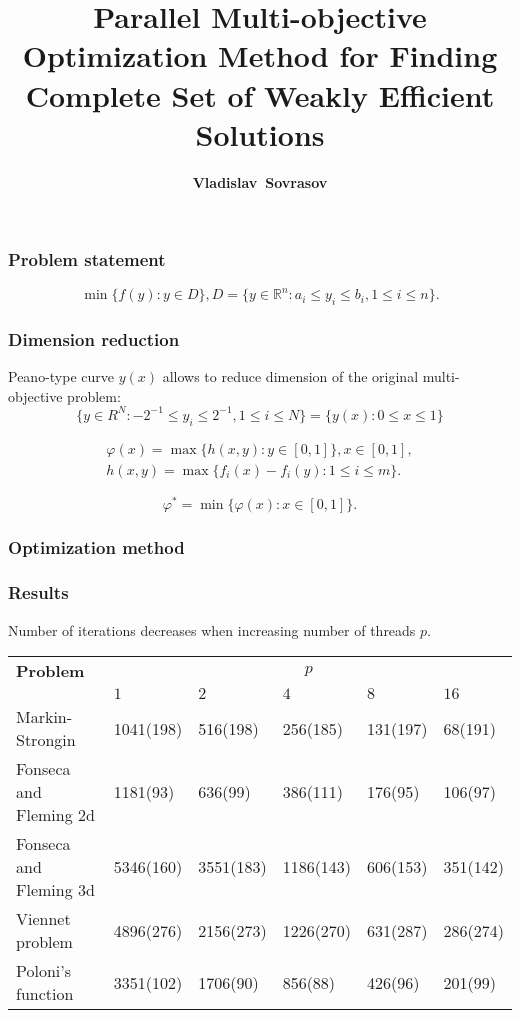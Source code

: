 \documentclass[aspectratio=1610]{beamer}
\title{Parallel Multi-objective Optimization Method for Finding Complete Set of Weakly Efficient Solutions}
\author{\textbf{Vladislav~Sovrasov}}
\institute{Lobachevsky University}
\date{}
\begin{document}
\begin{frame}
\titlepage
\end{frame}

\begin{frame}
  \frametitle{Problem statement}
  \begin{displaymath}
    \label{eq:problem}
    \min\{f(y): y\in D\}, D=\{y\in \mathbb{R}^n: a_i \leqslant y_i \leqslant b_i, 1\leqslant i
  \leqslant n \}.
\end{displaymath}
\end{frame}

\begin{frame}
  \frametitle{Dimension reduction}
  Peano-type curve \(y(x)\) allows to reduce dimension of the original multi-objective problem:
  \begin{displaymath}
  \lbrace y\in R^N:-2^{-1}\leqslant y_i\leqslant 2^{-1},1\leqslant i\leqslant
  N\rbrace=\{y(x):0\leqslant x\leqslant 1\}
  \end{displaymath}


  \begin{eqnarray*}
    \varphi(x)=\max\{h(x,y):y\in [0,1]\},x\in [0,1],\\
    h(x,y)=\max\{f_i(x)-f_i(y):1\leqslant i\leqslant m\}.
  \end{eqnarray*}

  \begin{displaymath}
    \varphi^*=\min\{\varphi(x):x\in [0,1]\}.
  \end{displaymath}
\end{frame}

\begin{frame}
  \frametitle{Optimization method}

\end{frame}

\begin{frame}
  \frametitle{Results}

  Number of iterations decreases when increasing number of threads \(p\).
  \begin{table}
    \centering
    \begin{tabular}{|l|p{1.5cm}|p{1.5cm}|p{1.5cm}|p{1.5cm}|p{1.5cm}|}
  \hline
  \textbf{Problem} & \multicolumn{5}{c|}{\(p\)}\\
  \cline{2-6}
    & \(1\) & \(2\) & \(4\) & \(8\) & \(16\)\\
  \hline
  Markin-Strongin & 1041(198) & 516(198) & 256(185) & 131(197) & 68(191) \\
  \hline
  Fonseca and Fleming 2d & 1181(93) & 636(99) & 386(111) & 176(95) & 106(97) \\
  \hline
  Fonseca and Fleming 3d & 5346(160) & 3551(183) & 1186(143) & 606(153) & 351(142) \\
  \hline
  Viennet problem & 4896(276) & 2156(273) & 1226(270) & 631(287) & 286(274)\\
  \hline
  Poloni's function & 3351(102) & 1706(90) & 856(88) & 426(96) & 201(99) \\
  \hline
  \end{tabular}
  \end{table}

\end{frame}
\end{document}
